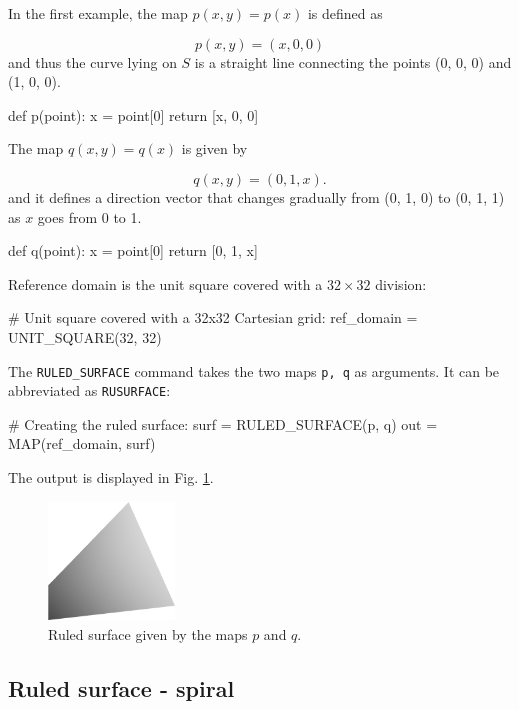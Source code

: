 In the first example, the map $p(x, y) = p(x)$ is defined as

$$
p(x, y) = (x, 0, 0)
$$
and thus the curve lying on $S$ is a straight line connecting the points 
(0, 0, 0) and (1, 0, 0). 

\begin{bluecode}
def p(point):
    x = point[0]
    return [x, 0, 0]
\end{bluecode}
The map $q(x, y) = q(x)$ is given by

$$
q(x, y) = (0, 1, x).
$$
and it defines a direction vector that changes gradually from 
(0, 1, 0) to (0, 1, 1) as $x$ goes from 0 to 1.

\begin{bluecode}
def q(point):
    x = point[0]
    return [0, 1, x]
\end{bluecode}
Reference domain is the unit square covered with a $32 \times 32$
division:

\begin{bluecode}
# Unit square covered with a 32x32 Cartesian grid:  
ref_domain = UNIT_SQUARE(32, 32)
\end{bluecode}
The {\tt RULED\_SURFACE} command takes the two maps {\tt p, q}
as arguments. It can be abbreviated as {\tt RUSURFACE}: 

\begin{bluecode}
# Creating the ruled surface:
surf = RULED_SURFACE(p, q)
out = MAP(ref_domain, surf)
\end{bluecode}
The output is displayed in Fig. \ref{fig:curves-6}.

\begin{figure}[!ht]
\begin{center}
\includegraphics[width=0.3\textwidth]{img/curves-6.png}
\end{center}
\vspace{-4mm}
\caption{Ruled surface given by the maps $p$ and $q$.}
\label{fig:curves-6}
\end{figure}

\subsection{Ruled surface - spiral}

